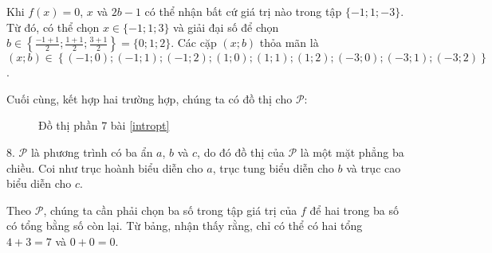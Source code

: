 Khi $f(x) = 0$, $x$ và $2b-1$ có thể nhận bất cứ giá trị nào trong tập $\{-1; 1; -3\}$. Từ đó, có thể chọn $x \in \{-1; 1; 3\}$ và giải đại số để chọn $b \in \left\{\frac{-1+1}{2}; \frac{1+1}{2}; \frac{3+1}{2}\right\} = \{0; 1; 2\}$. Các cặp $(x; b)$ thỏa mãn là $(x; b) \in \left\{\left(-1; 0\right); \left(-1; 1\right); \left(-1; 2\right); \left(1; 0\right); \left(1; 1\right); \left(1; 2\right); \left(-3; 0\right); \left(-3; 1\right); \left(-3; 2\right)\right\}$.

Cuối cùng, kết hợp hai trường hợp, chúng ta có đồ thị cho $\mathcal{P}$:

\begin{figure}[H]
   \centering
   \caption{Đồ thị phần 7 bài \ref{intropt}}
   \label{fig:dtp7}
\end{figure}

8. $\mathcal{P}$ là phương trình có ba ẩn $a$, $b$ và $c$, do đó đồ thị của $\mathcal{P}$ là một mặt phẳng ba chiều. Coi như trục hoành biểu diễn cho $a$, trục tung biểu diễn cho $b$ và trục cao biểu diễn cho $c$.

Theo $\mathcal{P}$, chúng ta cần phải chọn ba số trong tập giá trị của $f$ để hai trong ba số có tổng bằng số còn lại. Từ bảng, nhận thấy rằng, chỉ có thể có hai tổng $4 + 3 = 7$ và $0 + 0 = 0$.

